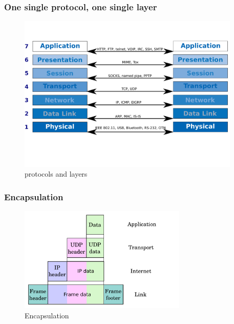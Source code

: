   \begin{frame}
    \frametitle{One single protocol, one single layer}
    \begin{figure}[t]
      \centering
      \includegraphics[height=7.5cm]{./imgs/layer2protocol.pdf}
      \caption{protocols and layers}
      \label{fig:layers2proto}
    \end{figure}
  \end{frame}
  \begin{frame}
    \frametitle{Encapsulation}
    \begin{figure}[t]
      \centering
      \includegraphics[height=5cm]{./imgs/encapsulation.pdf}
      \caption{Encapsulation}
      \label{fig:encapsulation}
    \end{figure}
  \end{frame}

